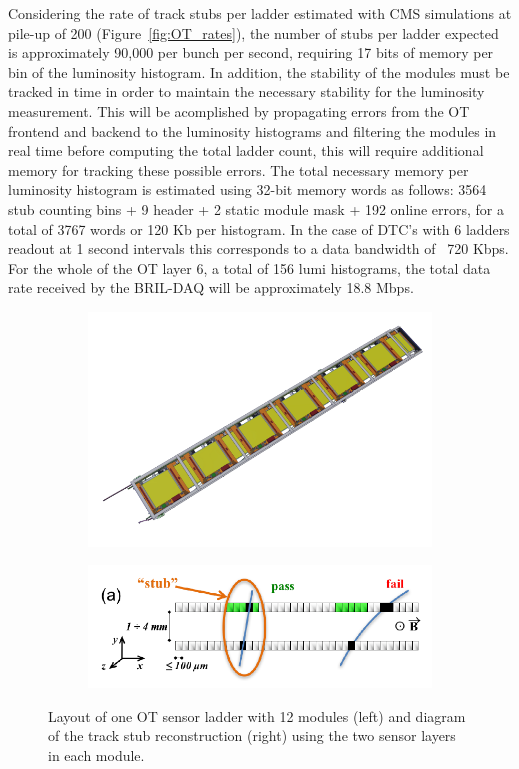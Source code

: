 Considering the rate of track stubs per ladder estimated with CMS simulations at pile-up of 200  (Figure~\ref{fig:OT_rates}),
the number of stubs per ladder expected is approximately 90,000 per bunch per second, requiring 17 bits of memory per bin of the luminosity histogram.
In addition, the stability of the modules must be tracked in time in order to maintain the necessary stability for the luminosity measurement.
This will be acomplished by propagating errors from the OT frontend and backend to the luminosity histograms
and filtering the modules in real time before computing the total ladder count, this will require additional memory for tracking these possible errors.
The total necessary memory per luminosity histogram is estimated using 32-bit memory words as follows:
3564 stub counting bins + 9 header + 2 static module mask + 192 online errors, for a total of 3767 words or 120 Kb per histogram.
In the case of DTC's with 6 ladders readout at 1 second intervals this corresponds to a data bandwidth of ~720 Kbps.
For the whole of the OT layer 6, a total of 156 lumi histograms, the total data rate received by the BRIL-DAQ will be approximately 18.8 Mbps.



\clearpage

\begin{figure}[h!]
\centering
\begin{subfigure}
  \centering
  \includegraphics[width=.48\linewidth]{tex/Part2/fig/OT/OT-ladder.png}
\end{subfigure}
\begin{subfigure}
  \centering
  \includegraphics[width=.48\linewidth]{tex/Part2/fig/OT/OT-stub.png}
\end{subfigure}
\caption{
  Layout of one OT sensor ladder with 12 modules (left) and diagram of the track stub reconstruction (right) using the two sensor layers in each module.  
}
\label{fig:OT_ladder_stub}
\end{figure}



